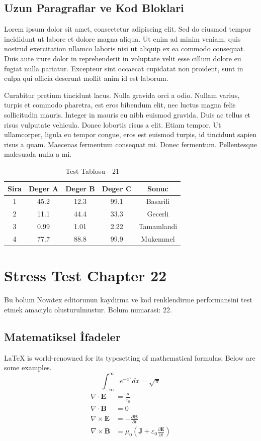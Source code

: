 \documentclass[12pt,a4paper]{article}
\begin{document}
\subsection{Uzun Paragraflar ve Kod Bloklari}
Lorem ipsum dolor sit amet, consectetur adipiscing elit. Sed do eiusmod tempor incididunt ut labore et dolore magna aliqua. Ut enim ad minim veniam, quis nostrud exercitation ullamco laboris nisi ut aliquip ex ea commodo consequat. Duis aute irure dolor in reprehenderit in voluptate velit esse cillum dolore eu fugiat nulla pariatur. Excepteur sint occaecat cupidatat non proident, sunt in culpa qui officia deserunt mollit anim id est laborum.

Curabitur pretium tincidunt lacus. Nulla gravida orci a odio. Nullam varius, turpis et commodo pharetra, est eros bibendum elit, nec luctus magna felis sollicitudin mauris. Integer in mauris eu nibh euismod gravida. Duis ac tellus et risus vulputate vehicula. Donec lobortis risus a elit. Etiam tempor. Ut ullamcorper, ligula eu tempor congue, eros est euismod turpis, id tincidunt sapien risus a quam. Maecenas fermentum consequat mi. Donec fermentum. Pellentesque malesuada nulla a mi.

\begin{table}[h!]
\centering
\begin{tabular}{|c|c|c|c|c|}
\hline
\textbf{Sira} & \textbf{Deger A} & \textbf{Deger B} & \textbf{Deger C} & \textbf{Sonuc} \\
\hline
1 & 45.2 & 12.3 & 99.1 & Basarili \\
2 & 11.1 & 44.4 & 33.3 & Gecerli \\
3 & 0.99 & 1.01 & 2.22 & Tamamlandi \\
4 & 77.7 & 88.8 & 99.9 & Mukemmel \\
\hline
\end{tabular}
\caption{Test Tablosu - 21}
\end{table}

\newpage
\section{Stress Test Chapter 22}
Bu bolum Novatex editorunun kaydirma ve kod renklendirme performansini test etmek amaciyla olusturulmustur. Bolum numarasi: 22.

\subsection{Matematiksel İfadeler}
\LaTeX{} is world-renowned for its typesetting of mathematical formulas. Below are some examples.
\begin{equation}
\int_{-\infty}^{\infty} e^{-x^2} dx = \sqrt{\pi}
\end{equation}
\begin{align}
\nabla \cdot \mathbf{E} &= \frac{\rho}{\varepsilon_0} \\
\nabla \cdot \mathbf{B} &= 0 \\
\nabla \times \mathbf{E} &= -\frac{\partial \mathbf{B}}{\partial t} \\
\nabla \times \mathbf{B} &= \mu_0\left(\mathbf{J} + \varepsilon_0 \frac{\partial \mathbf{E}}{\partial t}\right)
\end{align}
\end{document}
